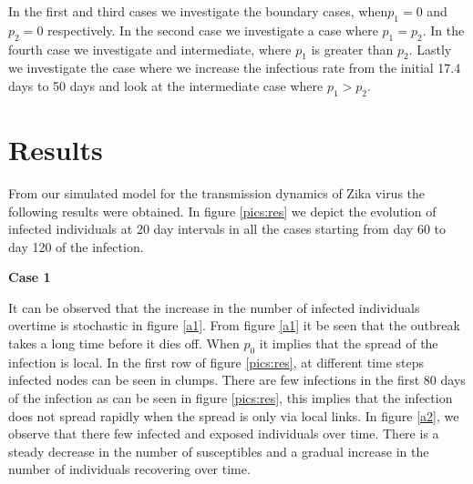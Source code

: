 In the first  and third cases we investigate the boundary cases, when$p_1 = 0$ and  $p_2 = 0$ respectively.  In the second case we investigate a case where $p_1 = p_2$. In the    fourth case we investigate and intermediate, where $p_1$ is greater than $p_2$. Lastly we investigate the case where we increase the infectious rate from the initial 17.4 days to 50 days and look at the intermediate case where $p_1 > p_2$. 

\newpage
\section{Results}


From our simulated model for the transmission dynamics of Zika virus the following results were obtained. In figure \ref{pics:res} we depict the evolution of infected individuals at 20 day intervals in all the cases starting from day 60 to day 120 of the infection.

\textbf{Case 1}

It can be observed that the increase in the number of infected individuals overtime is stochastic in figure \ref{a1}.  From figure \ref{a1} it be seen that the outbreak takes a long time before it dies off. When $p_0$ it implies that the spread of the infection is local. In the first row  of figure \ref{pics:res}, at different time steps infected nodes can be seen in clumps. There are few infections in the first 80 days of the infection as can be seen  in figure \ref{pics:res}, this implies that the infection does not spread rapidly when the spread is only via local links. In figure \ref{a2}, we observe that there few infected and exposed individuals over time. There is a steady decrease in the number of susceptibles and a gradual increase in the number of individuals recovering over time.


